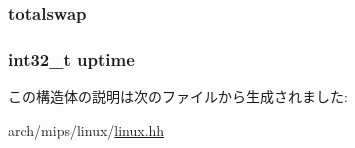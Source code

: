 \label{structMipsLinux_1_1tgt__sysinfo_aec5052a5ea8190b75fe495a9908ab9e9}
\hypertarget{structMipsLinux_1_1tgt__sysinfo_affcb72366c4cc75f904c0a7bf7c72a47}{
\subsubsection[{totalswap}]{ {\bf totalswap}}}
\label{structMipsLinux_1_1tgt__sysinfo_affcb72366c4cc75f904c0a7bf7c72a47}
\hypertarget{structMipsLinux_1_1tgt__sysinfo_acaed7912557581c7ea77bf8c1ae4ccf2}{
\subsubsection[{uptime}]{\setlength{\rightskip}{0pt plus 5cm}int32\_\-t {\bf uptime}}}
\label{structMipsLinux_1_1tgt__sysinfo_acaed7912557581c7ea77bf8c1ae4ccf2}


この構造体の説明は次のファイルから生成されました:\begin{DoxyCompactItemize}
\item 
arch/mips/linux/\hyperlink{arch_2mips_2linux_2linux_8hh}{linux.hh}\end{DoxyCompactItemize}
